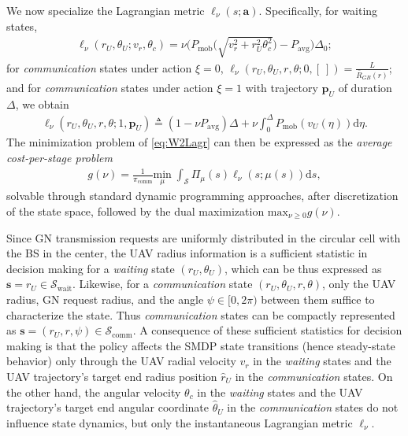 \documentclass[12pt, draftcls, onecolumn]{IEEEtran}
\theoremstyle{plain}
\theoremstyle{definition}
\theoremstyle{remark}
\begin{document}
We now specialize the Lagrangian metric $\ell_{\nu}(s;\mathbf{a})$. Specifically, for waiting states,
\begin{align}\label{eq:EllWait}
    \ell_\nu(r_U,\theta_U; v_r,\theta_c)
    =\nu \Big(P_{\mathrm{mob}} \Big(\sqrt{v_{r}^{2} + r_U^2\theta_{c}^{2}}\Big)- P_{\mathrm{avg}} \Big)\Delta_0;
    \end{align}
    for \emph{communication} states under action $\xi=0$, $\ell_{\nu}(r_U,\theta_U,r,\theta; 0, [\ ]) = \frac{L}{\bar{R}_{GB}(r)}$; and for \emph{communication} states under action $\xi=1$ with trajectory 
    $\mathbf p_U$ of duration $\Delta$, we obtain
    \begin{align}\label{eq:EllComm}
    \ell_\nu(r_U,\theta_U,r,\theta; 1,\mathbf p_U)
    \triangleq(1-\nu P_{\mathrm{avg}})\Delta + \nu \int_0^\Delta P_{\mathrm{mob}} \left(v_U (\eta) \right)\mathrm d\eta.
\end{align}
The minimization problem of \eqref{eq:W2Lagr} can then be expressed as the \emph{average cost-per-stage problem}
\begin{align}\label{eq:TotalGMin}
	g(\nu) = \frac{1}{\pi_{\mathrm{comm}}}\underset{\mu}{\mathrm{min}} \; \int_{\mathcal{S}} \Pi_{\mu}(s) 
	\ell_\nu(s; \mu(s))\mathrm d s,
\end{align}
solvable through standard dynamic programming approaches, after discretization of the state space, followed by the dual maximization $\mathrm{max}_{\nu{\geq}0}g(\nu)$.

Since GN transmission requests are uniformly distributed in the circular cell with the BS in the center, the UAV radius information is a sufficient statistic in decision making for a \emph{waiting} state $(r_{U},\theta_{U})$, which can be thus expressed as $\mathbf{s}{=}r_{U}{\in}\mathcal{S}_{\mathrm{wait}}$. Likewise, for a \emph{communication} state $(r_{U},\theta_{U},r,\theta)$, only the UAV radius, GN request radius, and the angle $\psi{\in}[0,2\pi)$ between them suffice to characterize the state. Thus \emph{communication} states can be compactly represented as $\mathbf{s}{=}(r_{U},r,\psi){\in}\mathcal{S}_{\mathrm{comm}}$. A consequence of these sufficient statistics for decision making is that the policy affects the SMDP state transitions (hence steady-state behavior) only through the UAV radial velocity $v_{r}$ in the \emph{waiting} states and the UAV trajectory's target end radius position $\hat{r}_{U}$ in the \emph{communication} states. On the other hand, the angular velocity $\theta_{c}$ in the \emph{waiting} states and the UAV trajectory's target end angular coordinate $\hat{\theta}_{U}$ in the \emph{communication} states do not influence state dynamics, but only the instantaneous Lagrangian metric $\ell_{\nu}$.
\end{document}
